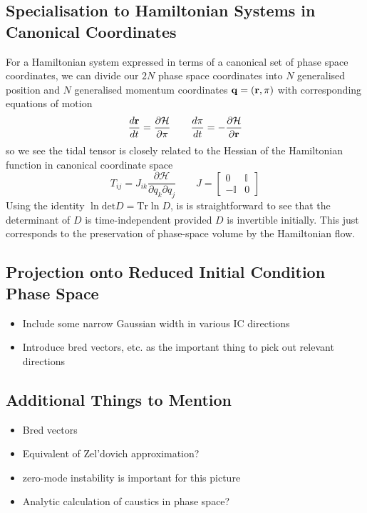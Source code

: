 \subsection{Specialisation to Hamiltonian Systems in Canonical Coordinates}
For a Hamiltonian system expressed in terms of a canonical set of phase space coordinates, we can divide our $2N$ phase space coordinates into $N$ generalised position and $N$ generalised momentum coordinates ${\bf q} = \left({\bf r},{\bf \pi}\right)$ with corresponding equations of motion
\begin{equation}
  \frac{d {\bf r}}{dt} = \frac{\partial\mathcal{H}}{\partial {\bf \pi}} \qquad \frac{d{\bf \pi}}{dt} = -\frac{\partial \mathcal{H}}{\partial {\bf r}}
\end{equation}
so we see the tidal tensor is closely related to the Hessian of the Hamiltonian function in canonical coordinate space
\begin{equation}
  T_{ij} = J_{ik} \frac{\partial \mathcal{H}}{\partial q_k\partial q_j} \qquad J = \left[\begin{array}{cc} 0 & \mathbb{I} \\ -\mathbb{I} & 0 \end{array}\right]
\end{equation}
Using the identity $\ln\mathrm{det}D = \mathrm{Tr}\ln D$, is is straightforward to see that the determinant of $D$ is time-independent provided $D$ is invertible initially.
This just corresponds to the preservation of phase-space volume by the Hamiltonian flow.

\subsection{Projection onto Reduced Initial Condition Phase Space}
\begin{itemize}
\item Include some narrow Gaussian width in various IC directions
\item Introduce bred vectors, etc. as the important thing to pick out relevant directions
\end{itemize}

\subsection{Additional Things to Mention}
\begin{itemize}
\item Bred vectors
\item Equivalent of Zel'dovich approximation?
\item zero-mode instability is important for this picture
\item Analytic calculation of caustics in phase space?
\end{itemize}

